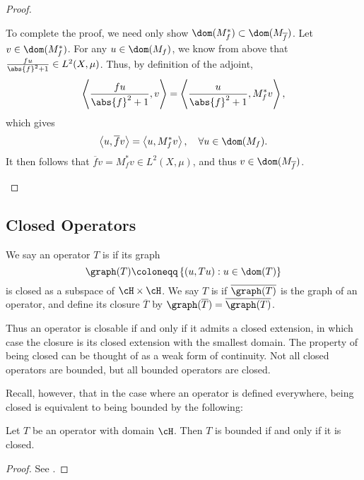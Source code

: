 \documentclass[oneside,reqno,letterpaper]{amsart}
\begin{document}
\begin{proof}
\begin{enumerate}[label=(\alph*)]
  To complete the proof, we need only show \(\dom(M_{f}^*) \subset \dom(M_{\overline{f}})\). 
  Let \(v \in \dom(M_{f}^*)\). 
  For any \(u \in \dom(M_f)\), we know from above that \(\frac{fu}{\abs{f}^2 + 1} \in L^2(X, \mu)\).
  Thus, by definition of the adjoint, 
  \[
  \left< \frac{fu}{\abs{f}^2 + 1}, v \right> 
  = \left< \frac{u}{\abs{f}^2 + 1}, M_f^* v \right>, 
  \] 
  which gives
  \[
    \left< u, \overline{f} v \right> = \left< u, M_f^* v \right>, \quad \forall u \in \dom(M_f) . 
  \] 
  It then follows that \(\overline{f} v = M_{f}^* v \in L^2(X, \mu)\), and thus \(v \in \dom(M_{\overline{f}})\). 
\end{enumerate}
\end{proof}




\subsection{Closed Operators}

\begin{definition}
  We say an operator \(T\) is  if its graph
  \[
  \graph(T) \coloneqq \left\{ (u, Tu): u \in \dom(T) \right\}
  \] 
  is closed as a subspace of \(\cH \times \cH\). 
  We say \(T\) is  if \(\overline{\graph(T)}\) is the graph of an operator, and define its closure \(\overline{T}\) by \(\graph(\overline{T}) = \overline{\graph(T)}\).
\end{definition}

Thus an operator is closable if and only if it admits a closed extension, in which case the closure is its closed extension with the smallest domain. 
The property of being closed can be thought of as a weak form of continuity.
Not all closed operators are bounded, but all bounded operators are closed. 

Recall, however, that in the case where an operator is defined everywhere, being closed is equivalent to being bounded by the following:
\begin{theorem}
\label{thm:closed-graph}
  Let \(T\) be an operator with domain \(\cH\). Then \(T\) is bounded if and only if it is closed. 
\end{theorem}
\begin{proof}
  See \cite[p.~37]{brezis2011functional}. 
\end{proof}
\end{document}
